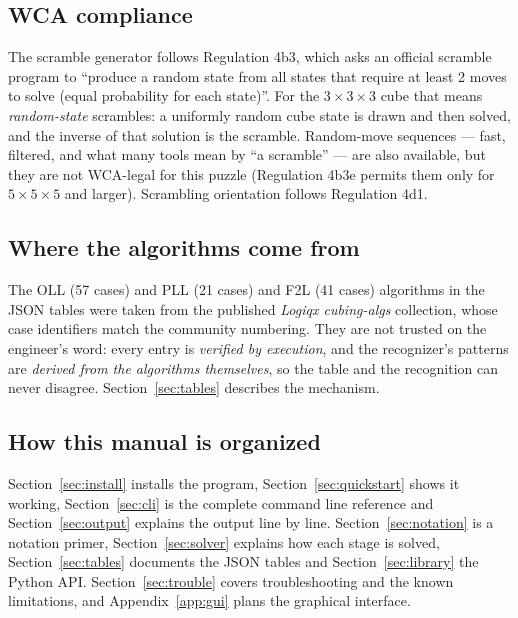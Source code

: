 \subsection{WCA compliance}

The scramble generator follows Regulation 4b3, which asks an official scramble
program to ``produce a random state from all states that require at least 2 moves
to solve (equal probability for each state)''.  For the $3\times3\times3$ cube that
means \emph{random-state} scrambles: a uniformly random cube state is drawn and then
solved, and the inverse of that solution is the scramble.  Random-move sequences ---
fast, filtered, and what many tools mean by ``a scramble'' --- are also available,
but they are not WCA-legal for this puzzle (Regulation 4b3e permits them only for
$5\times5\times5$ and larger).  Scrambling orientation follows Regulation 4d1.

\subsection{Where the algorithms come from}

The OLL (57 cases) and PLL (21 cases) and F2L (41 cases) algorithms in the JSON
tables were taken from the published \emph{Logiqx cubing-algs} collection, whose
case identifiers match the community numbering.  They are not trusted on the
engineer's word: every entry is \emph{verified by execution}, and the recognizer's
patterns are \emph{derived from the algorithms themselves}, so the table and the
recognition can never disagree.  Section~\ref{sec:tables} describes the mechanism.

\subsection{How this manual is organized}

Section~\ref{sec:install} installs the program, Section~\ref{sec:quickstart} shows
it working, Section~\ref{sec:cli} is the complete command line reference and
Section~\ref{sec:output} explains the output line by line.
Section~\ref{sec:notation} is a notation primer, Section~\ref{sec:solver} explains
how each stage is solved, Section~\ref{sec:tables} documents the JSON tables and
Section~\ref{sec:library} the Python API.  Section~\ref{sec:trouble} covers
troubleshooting and the known limitations, and Appendix~\ref{app:gui} plans the
graphical interface.
